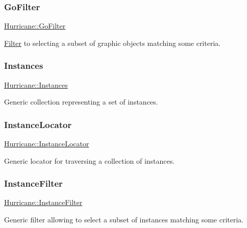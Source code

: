 \subsubsection{\texorpdfstring{Go\+Filter}{GoFilter}}
{\footnotesize\ttfamily \mbox{\hyperlink{namespaceHurricane_a372aada7b76742fd900d0bb2c5398e0c}{Hurricane\+::\+Go\+Filter}}}

\mbox{\hyperlink{classHurricane_1_1Filter}{Filter}} to selecting a subset of graphic objects matching some criteria. \mbox{\label{namespaceHurricane_ac9436b03a2926f34ad6863deae2baadc}} 
\subsubsection{\texorpdfstring{Instances}{Instances}}
{\footnotesize\ttfamily \mbox{\hyperlink{namespaceHurricane_ac9436b03a2926f34ad6863deae2baadc}{Hurricane\+::\+Instances}}}

Generic collection representing a set of instances. \mbox{\label{namespaceHurricane_af4f7fa4dc3a2d3bdcec6f375dc5a21bc}} 
\subsubsection{\texorpdfstring{Instance\+Locator}{InstanceLocator}}
{\footnotesize\ttfamily \mbox{\hyperlink{namespaceHurricane_af4f7fa4dc3a2d3bdcec6f375dc5a21bc}{Hurricane\+::\+Instance\+Locator}}}

Generic locator for traversing a collection of instances. \mbox{\label{namespaceHurricane_a889ec1441e1876d9addf89dfab32e772}} 
\subsubsection{\texorpdfstring{Instance\+Filter}{InstanceFilter}}
{\footnotesize\ttfamily \mbox{\hyperlink{namespaceHurricane_a889ec1441e1876d9addf89dfab32e772}{Hurricane\+::\+Instance\+Filter}}}

Generic filter allowing to select a subset of instances matching some criteria. \mbox{\label{namespaceHurricane_a7d26d99aeb5dd6d70d51bd35d2473e72}} 
